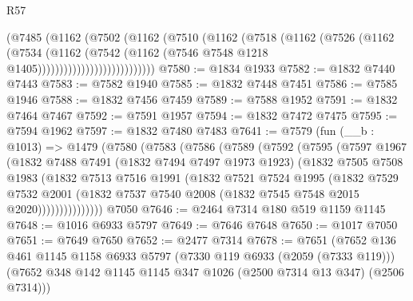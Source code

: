 \begin{lexlean}{R57}
\begin{coremodule}
                            (@7485
                              (@1162
                                (@7502
                                  (@1162
                                    (@7510
                                      (@1162
                                        (@7518
                                          (@1162
                                            (@7526
                                              (@1162
                                                (@7534
                                                  (@1162
                                                    (@7542
                                                      (@1162
                                                        (@7546
                                                          @7548
                                                          @1218
                                                          @1405)))))))))))))))))))))))))))
@7580 := @1834 @1933
@7582 := @1832 @7440 @7443
@7583 := @7582 @1940
@7585 := @1832 @7448 @7451
@7586 := @7585 @1946
@7588 := @1832 @7456 @7459
@7589 := @7588 @1952
@7591 := @1832 @7464 @7467
@7592 := @7591 @1957
@7594 := @1832 @7472 @7475
@7595 := @7594 @1962
@7597 := @1832 @7480 @7483
@7641 := @7579
    (fun (__b : @1013) =>
    @1479
      (@7580
        (@7583
          (@7586
            (@7589
              (@7592
                (@7595
                  (@7597
                    @1967
                    (@1832
                      @7488
                      @7491
                      (@1832 @7494 @7497 @1973 @1923)
                      (@1832
                        @7505
                        @7508
                        @1983
                        (@1832
                          @7513
                          @7516
                          @1991
                          (@1832
                            @7521
                            @7524
                            @1995
                            (@1832
                              @7529
                              @7532
                              @2001
                              (@1832 @7537 @7540 @2008 (@1832 @7545 @7548 @2015 @2020)))))))))))))))
    @7050
@7646 := @2464 @7314 @180 @519 @1159 @1145
@7648 := @1016 @6933 @5797
@7649 := @7646 @7648
@7650 := @1017 @7050
@7651 := @7649 @7650
@7652 := @2477 @7314
@7678 := @7651
    (@7652
      @136
      @461
      @1145
      @1158
      @6933
      @5797
      (@7330 @119 @6933 (@2059 (@7333 @119)))
      (@7652 @348 @142 @1145 @1145 @347 @1026 (@2500 @7314 @13 @347) (@2506 @7314)))

\end{coremodule}
\end{lexlean}
